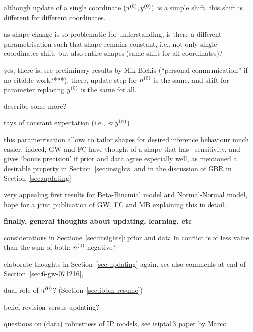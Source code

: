 although update of a single coordinate $(n^{(0)},y^{(0)})$ is a simple shift,
this shift is different for different coordinates.

as shape change is so problematic for understanding,
is there a different parametrisation such that shape remains constant,
i.e., not only single coordinates shift, but also entire shapes
(same shift for all coordinates)?

yes, there is, see preliminary results by Mik Bickis (``personal communication'' if no citable work?***).
there, update step for $n^{(0)}$ is the same, and shift for parameter replacing $y^{(0)}$ is the same for all. 

describe some more?

rays of constant expectation (i.e., $\approx y^{(n)}$)

this parametrisation allows to tailor shapes for desired inference behaviour much easier.
indeed, GW and FC have thought of a shape that has \pdc\ sensitivity,
and gives `bonus precision' if prior and data agree especially well,
as mentioned a desirable property in Section~\ref{sec:insights}
and in the discussion of GBR in Section~\ref{sec:updating}

very appealing first results for Beta-Binomial model and Normal-Normal model,
hope for a joint publication of GW, FC and MB explaining this in detail.


\textbf{finally, general thoughts about updating, learning, etc}

considerations in Sectione~\ref{sec:insights}:
prior and data in conflict is of less value than the sum of both:
$n^{(0)}$ negative?


elaborate thoughts in Section~\ref{sec:updating} again,
see also comments at end of Section~\ref{sec:6-gw-071216},

dual role of $n^{(0)}$? (Section~\ref{sec:ibbm-resume})

belief revision versus updating?

questions on (data) robustness of IP models, see isipta13 paper by Marco



